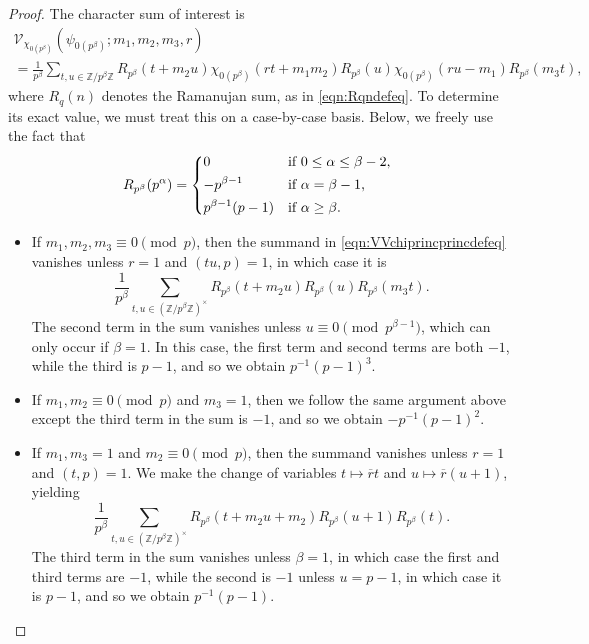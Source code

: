 \documentclass[11pt,a4paper]{amsart}
\newcommand{\VV}{\mathcal{V}}
\newcommand{\Z}{\mathbb{Z}}
\numberwithin{equation}{section}
\theoremstyle{remark}
\theoremstyle{definition}
\begin{document}
\begin{proof}
The character sum of interest is
\begin{multline}
\label{eqn:VVchiprincprincdefeq}
\VV_{\chi_{0(p^{\beta})}}(\psi_{0(p^{\beta})};m_1,m_2,m_3,r)	\\
= \frac{1}{p^{\beta}} \sum_{t,u \in \Z/p^{\beta}\Z} R_{p^{\beta}}(t + m_2 u) \chi_{0(p^{\beta})}(rt + m_1 m_2) R_{p^{\beta}}(u) \chi_{0(p^{\beta})}(ru - m_1) R_{p^{\beta}}(m_3 t),
\end{multline}
where $R_q(n)$ denotes the Ramanujan sum, as in \eqref{eqn:Rqndefeq}. To determine its exact value, we must treat this on a case-by-case basis. Below, we freely use the fact that
\begin{equation}
\label{eqn:Rpbetapalphadefeq}
R_{p^{\beta}}(p^{\alpha}) = \begin{dcases*}
0 & if $0 \leq \alpha \leq \beta - 2$,	\\
-p^{\beta - 1} & if $\alpha = \beta - 1$,	\\
p^{\beta - 1}(p - 1) & if $\alpha \geq \beta$.
\end{dcases*}
\end{equation}
\begin{itemize}[leftmargin=*]
\item If $m_1,m_2,m_3 \equiv 0 \pmod{p}$, then the summand in \eqref{eqn:VVchiprincprincdefeq} vanishes unless $r = 1$ and $(tu,p) = 1$, in which case it is
\[\frac{1}{p^{\beta}} \sum_{t,u \in (\Z/p^{\beta}\Z)^{\times}} R_{p^{\beta}}(t + m_2 u) R_{p^{\beta}}(u) R_{p^{\beta}}(m_3 t).\]
The second term in the sum vanishes unless $u \equiv 0 \pmod{p^{\beta - 1}}$, which can only occur if $\beta = 1$. In this case, the first term and second terms are both $-1$, while the third is $p - 1$, and so we obtain $p^{-1} (p - 1)^3$.
\item If $m_1,m_2 \equiv 0 \pmod{p}$ and $m_3 = 1$, then we follow the same argument above except the third term in the sum is $-1$, and so we obtain $-p^{-1} (p - 1)^2$.
\item If $m_1, m_3 = 1$ and $m_2 \equiv 0 \pmod{p}$, then the summand vanishes unless $r = 1$ and $(t,p) = 1$. We make the change of variables $t \mapsto \overline{r} t$ and $u \mapsto \overline{r} (u + 1)$, yielding
\[\frac{1}{p^{\beta}} \sum_{t,u \in (\Z/p^{\beta}\Z)^{\times}} R_{p^{\beta}}(t + m_2 u + m_2) R_{p^{\beta}}(u + 1) R_{p^{\beta}}(t).\]
The third term in the sum vanishes unless $\beta = 1$, in which case the first and third terms are $-1$, while the second is $-1$ unless $u = p - 1$, in which case it is $p - 1$, and so we obtain $p^{-1} (p - 1)$.

\end{itemize}
\end{proof}
\end{document}
